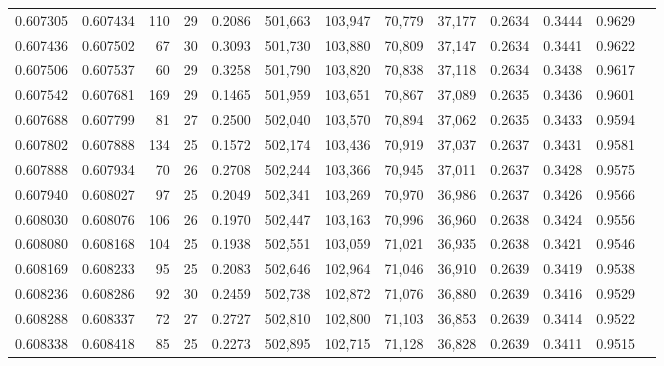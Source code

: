\begin{tabular}{rrrrrrrrrrrrr}
0.607305 & 0.607434 & 110 &  29 &                                     0.2086 & 501,663 & 103,947 &  70,779 &  37,177 & 0.2634 & 0.3444 & 0.9629 \\
0.607436 & 0.607502 &  67 &  30 &                                     0.3093 & 501,730 & 103,880 &  70,809 &  37,147 & 0.2634 & 0.3441 & 0.9622 \\
0.607506 & 0.607537 &  60 &  29 &                                     0.3258 & 501,790 & 103,820 &  70,838 &  37,118 & 0.2634 & 0.3438 & 0.9617 \\
0.607542 & 0.607681 & 169 &  29 &                                     0.1465 & 501,959 & 103,651 &  70,867 &  37,089 & 0.2635 & 0.3436 & 0.9601 \\
0.607688 & 0.607799 &  81 &  27 &                                     0.2500 & 502,040 & 103,570 &  70,894 &  37,062 & 0.2635 & 0.3433 & 0.9594 \\
0.607802 & 0.607888 & 134 &  25 &                                     0.1572 & 502,174 & 103,436 &  70,919 &  37,037 & 0.2637 & 0.3431 & 0.9581 \\
0.607888 & 0.607934 &  70 &  26 &                                     0.2708 & 502,244 & 103,366 &  70,945 &  37,011 & 0.2637 & 0.3428 & 0.9575 \\
0.607940 & 0.608027 &  97 &  25 &                                     0.2049 & 502,341 & 103,269 &  70,970 &  36,986 & 0.2637 & 0.3426 & 0.9566 \\
0.608030 & 0.608076 & 106 &  26 &                                     0.1970 & 502,447 & 103,163 &  70,996 &  36,960 & 0.2638 & 0.3424 & 0.9556 \\
0.608080 & 0.608168 & 104 &  25 &                                     0.1938 & 502,551 & 103,059 &  71,021 &  36,935 & 0.2638 & 0.3421 & 0.9546 \\
0.608169 & 0.608233 &  95 &  25 &                                     0.2083 & 502,646 & 102,964 &  71,046 &  36,910 & 0.2639 & 0.3419 & 0.9538 \\
0.608236 & 0.608286 &  92 &  30 &                                     0.2459 & 502,738 & 102,872 &  71,076 &  36,880 & 0.2639 & 0.3416 & 0.9529 \\
0.608288 & 0.608337 &  72 &  27 &                                     0.2727 & 502,810 & 102,800 &  71,103 &  36,853 & 0.2639 & 0.3414 & 0.9522 \\
0.608338 & 0.608418 &  85 &  25 &                                     0.2273 & 502,895 & 102,715 &  71,128 &  36,828 & 0.2639 & 0.3411 & 0.9515 \\

\end{tabular}
